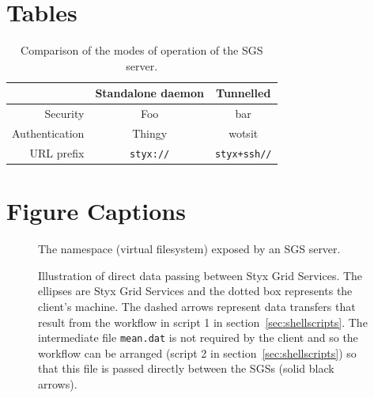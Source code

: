 \documentclass[a4paper]{article}
\begin{document}
%
%


\newpage
\singlespace

\section*{Tables}

\begin{table}[h]
\centering
\begin{tabular}[t]{|r|c|c|}
\hline
&Standalone daemon & Tunnelled \\
\hline
Security & Foo & bar\\
Authentication & Thingy & wotsit\\
URL prefix & \texttt{styx://} & \texttt{styx+ssh//} \\
\hline
\end{tabular}
\caption{Comparison of the modes of operation of the SGS server.}\label{tab:servermodes}
\end{table}

\newpage

\section*{Figure Captions}

\begin{figure}[h]
\caption{The namespace (virtual filesystem) exposed by an SGS server.}\label{fig:sgsnamespace}
\end{figure}

\begin{figure}[h]
\caption{Illustration of direct data passing between Styx Grid Services.  The ellipses are Styx Grid Services and the dotted box represents the client's machine.  The dashed arrows represent data transfers that result from the workflow in script 1 in section~\ref{sec:shellscripts}.  The intermediate file \texttt{mean.dat} is not required by the client and so the workflow can be arranged (script 2 in section~\ref{sec:shellscripts}) so that this file is passed directly between the SGSs (solid black arrows).}\label{fig:datapassing}
\end{figure}

\newpage
\end{document}
